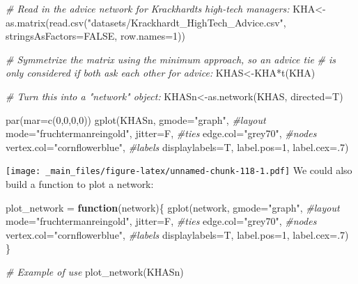 \documentclass[
  notitlepage,
  onecolumn,
  openany]{book}
\newenvironment{Shaded}{\begin{snugshade}}{\end{snugshade}}
\newcommand{\AttributeTok}[1]{\textcolor[rgb]{0.77,0.63,0.00}{#1}}
\newcommand{\CommentTok}[1]{\textcolor[rgb]{0.56,0.35,0.01}{\textit{#1}}}
\newcommand{\ConstantTok}[1]{\textcolor[rgb]{0.00,0.00,0.00}{#1}}
\newcommand{\ControlFlowTok}[1]{\textcolor[rgb]{0.13,0.29,0.53}{\textbf{#1}}}
\newcommand{\DecValTok}[1]{\textcolor[rgb]{0.00,0.00,0.81}{#1}}
\newcommand{\FunctionTok}[1]{\textcolor[rgb]{0.00,0.00,0.00}{#1}}
\newcommand{\NormalTok}[1]{#1}
\newcommand{\OtherTok}[1]{\textcolor[rgb]{0.56,0.35,0.01}{#1}}
\newcommand{\SpecialCharTok}[1]{\textcolor[rgb]{0.00,0.00,0.00}{#1}}
\newcommand{\StringTok}[1]{\textcolor[rgb]{0.31,0.60,0.02}{#1}}
\begin{document}
\begin{Shaded}
\begin{Highlighting}[]
\CommentTok{\# Read in the advice network for Krackhardt\textquotesingle{}s high{-}tech managers:}
\NormalTok{KHA}\OtherTok{\textless{}{-}}\FunctionTok{as.matrix}\NormalTok{(}\FunctionTok{read.csv}\NormalTok{(}\StringTok{"datasets/Krackhardt\_HighTech\_Advice.csv"}\NormalTok{,}
                        \AttributeTok{stringsAsFactors=}\ConstantTok{FALSE}\NormalTok{, }\AttributeTok{row.names=}\DecValTok{1}\NormalTok{))}

\CommentTok{\# Symmetrize the matrix using the minimum approach, so an advice tie}
\CommentTok{\# is only considered if both ask each other for advice:}
\NormalTok{KHAS}\OtherTok{\textless{}{-}}\NormalTok{KHA}\SpecialCharTok{*}\FunctionTok{t}\NormalTok{(KHA)}

\CommentTok{\# Turn this into a "network" object:}
\NormalTok{KHASn}\OtherTok{\textless{}{-}}\FunctionTok{as.network}\NormalTok{(KHAS, }\AttributeTok{directed=}\NormalTok{T)}

\FunctionTok{par}\NormalTok{(}\AttributeTok{mar=}\FunctionTok{c}\NormalTok{(}\DecValTok{0}\NormalTok{,}\DecValTok{0}\NormalTok{,}\DecValTok{0}\NormalTok{,}\DecValTok{0}\NormalTok{))}
\FunctionTok{gplot}\NormalTok{(KHASn, }
      \AttributeTok{gmode=}\StringTok{"graph"}\NormalTok{,}
      \CommentTok{\#layout}
      \AttributeTok{mode=}\StringTok{"fruchtermanreingold"}\NormalTok{,}
      \AttributeTok{jitter=}\NormalTok{F,}
      \CommentTok{\#ties}
      \AttributeTok{edge.col=}\StringTok{"grey70"}\NormalTok{,}
      \CommentTok{\#nodes}
      \AttributeTok{vertex.col=}\StringTok{"cornflowerblue"}\NormalTok{,}
      \CommentTok{\#labels}
      \AttributeTok{displaylabels=}\NormalTok{T,}
      \AttributeTok{label.pos=}\DecValTok{1}\NormalTok{,}
      \AttributeTok{label.cex=}\NormalTok{.}\DecValTok{7}\NormalTok{)}
\end{Highlighting}
\end{Shaded}

\texttt{[image: \_main\_files/figure-latex/unnamed-chunk-118-1.pdf]}
We could also build a function to plot a network:

\begin{Shaded}
\begin{Highlighting}[]
\NormalTok{plot\_network }\OtherTok{=} \ControlFlowTok{function}\NormalTok{(network)\{}
    \FunctionTok{gplot}\NormalTok{(network, }
      \AttributeTok{gmode=}\StringTok{"graph"}\NormalTok{,}
      \CommentTok{\#layout}
      \AttributeTok{mode=}\StringTok{"fruchtermanreingold"}\NormalTok{,}
      \AttributeTok{jitter=}\NormalTok{F,}
      \CommentTok{\#ties}
      \AttributeTok{edge.col=}\StringTok{"grey70"}\NormalTok{,}
      \CommentTok{\#nodes}
      \AttributeTok{vertex.col=}\StringTok{"cornflowerblue"}\NormalTok{,}
      \CommentTok{\#labels}
      \AttributeTok{displaylabels=}\NormalTok{T,}
      \AttributeTok{label.pos=}\DecValTok{1}\NormalTok{,}
      \AttributeTok{label.cex=}\NormalTok{.}\DecValTok{7}\NormalTok{)}
\NormalTok{\}}

\CommentTok{\# Example of use}
\FunctionTok{plot\_network}\NormalTok{(KHASn)}
\end{Highlighting}
\end{Shaded}
\end{document}
